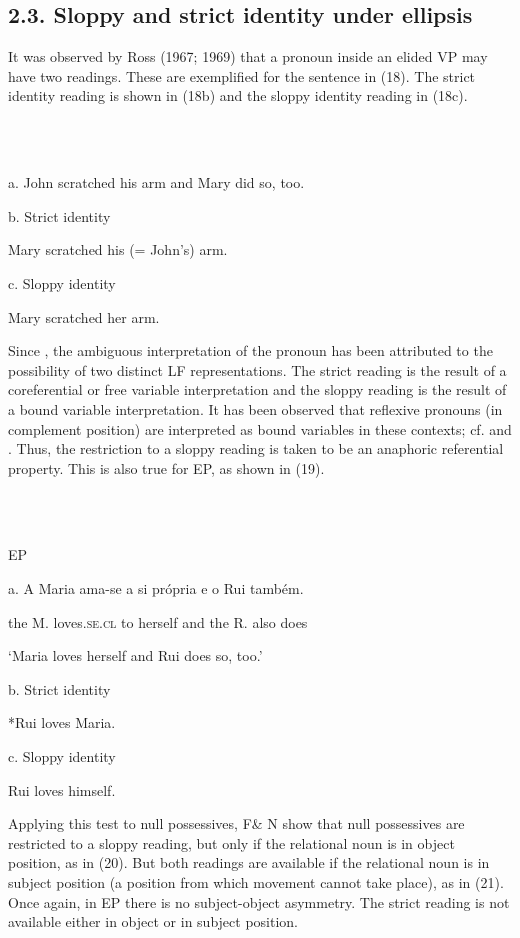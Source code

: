 \documentclass[output=paper]{langsci/langscibook}
\begin{document}
\subsection{ 2.3. Sloppy and strict identity under ellipsis}

It was observed by Ross (1967; 1969) that a pronoun inside an elided VP may have two readings. These are exemplified for the sentence in (18). The strict identity reading is shown in (18b) and the sloppy identity reading in (18c).

\ea%
    \label{ex:key:18}
    \gll\\
        \\
    \glt
    \z

          \citet[207]{Ross1967}

  a.  John scratched his arm and Mary did so, too.

b.  Strict identity

Mary scratched his (= John’s) arm.

c.  Sloppy identity

Mary scratched her arm.

Since \citet{Sag1980}, the ambiguous interpretation of the pronoun has been attributed to the possibility of two distinct LF representations. The strict reading is the result of a coreferential or free variable interpretation and the sloppy reading is the result of a bound variable interpretation. It has been observed that reflexive pronouns (in complement position) are interpreted as bound variables in these contexts; cf. \citet{Sag1980} and \citet{Hicks2009}. Thus, the restriction to a sloppy reading is taken to be an anaphoric referential property. This is also true for EP, as shown in (19).

\ea%
    \label{ex:key:19}
    \gll\\
        \\
    \glt
    \z

          EP

  a.  A Maria ama-se a si própria e o Rui também.

the M. loves.\textsc{se.cl} to herself and the R. also does

‘Maria loves herself and Rui does so, too.’

b.  Strict identity

*Rui loves Maria.

  c.  Sloppy identity

Rui loves himself.

Applying this test to null possessives, F\& N show that null possessives are restricted to a sloppy reading, but only if the relational noun is in object position, as in (20). But both readings are available if the relational noun is in subject position (a position from which movement cannot take place), as in (21). Once again, in EP there is no subject-object asymmetry. The strict reading is not available either in object or in subject position.
\end{document}
